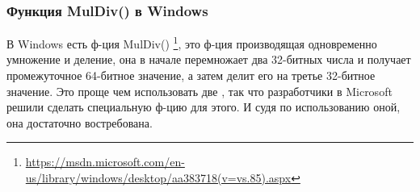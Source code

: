 \subsubsection{Функция MulDiv() в Windows}

В Windows есть ф-ция MulDiv()
\footnote{\url{https://msdn.microsoft.com/en-us/library/windows/desktop/aa383718(v=vs.85).aspx}},
это ф-ция производящая одновременно умножение и деление, она в начале перемножает два 32-битных числа и получает
промежуточное 64-битное значение, а затем делит его на третье 32-битное значение.
Это проще чем использовать две , так что разработчики в Microsoft решили сделать специальную ф-цию
для этого.
И судя по использованию оной, она достаточно востребована.

